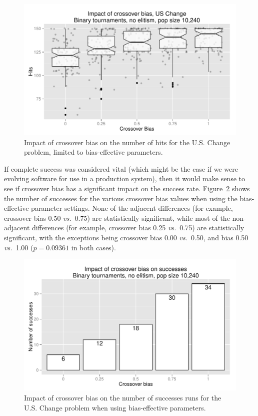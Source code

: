 \documentclass{sig-alternate}
\begin{document}
\begin{figure}[tb]
\centering
\includegraphics[width=0.45 \textwidth]{Plots/US_change_hits_strong.pdf}
\caption{Impact of crossover bias on the number of hits for the U.S. Change problem, limited to bias-effective
parameters.}
\label{fig:USChange_Hits_strong}
\end{figure}

%
%
%
%

If complete success was considered vital (which might be the case if we were evolving software for use in a production
system), then it would make sense to see if crossover bias has a significant impact on the success rate.
Figure~\ref{fig:USChange_Successes_strong} shows the number of successes for the various crossover bias values when
using the bias-effective parameter settings. None of the adjacent differences (for example, crossover bias 0.50
\emph{vs.}\ 0.75) are statistically significant, while most of the non-adjacent differences (for example, crossover bias
0.25 \emph{vs.}\ 0.75) are statistically significant, with the exceptions being crossover bias 0.00 \emph{vs.}\ 0.50, and
bias 0.50 \emph{vs.}\ 1.00 ($p=0.09361$ in both cases).

\begin{figure}
\centering
\includegraphics[width=0.45 \textwidth]{Plots/US_change_successes_strong.pdf}
\caption{Impact of crossover bias on the number of successes runs for the U.S. Change problem when using
bias-effective parameters.}
\label{fig:USChange_Successes_strong}
\end{figure}
\end{document}

